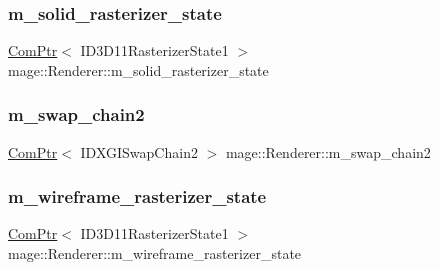 \subsubsection{\texorpdfstring{m\+\_\+solid\+\_\+rasterizer\+\_\+state}{m\_solid\_rasterizer\_state}}
{\footnotesize\ttfamily \hyperlink{namespacemage_ae74f374780900893caa5555d1031fd79}{Com\+Ptr}$<$ I\+D3\+D11\+Rasterizer\+State1 $>$ mage\+::\+Renderer\+::m\+\_\+solid\+\_\+rasterizer\+\_\+state\hspace{0.3cm}{\ttfamily [private]}}

\hypertarget{classmage_1_1_renderer_a96a55ac9d739141f6ea6692347134eec}{}\label{classmage_1_1_renderer_a96a55ac9d739141f6ea6692347134eec} 
\subsubsection{\texorpdfstring{m\+\_\+swap\+\_\+chain2}{m\_swap\_chain2}}
{\footnotesize\ttfamily \hyperlink{namespacemage_ae74f374780900893caa5555d1031fd79}{Com\+Ptr}$<$ I\+D\+X\+G\+I\+Swap\+Chain2 $>$ mage\+::\+Renderer\+::m\+\_\+swap\+\_\+chain2\hspace{0.3cm}{\ttfamily [private]}}

\hypertarget{classmage_1_1_renderer_a5049b7bdbf371963dd3e813323921760}{}\label{classmage_1_1_renderer_a5049b7bdbf371963dd3e813323921760} 
\subsubsection{\texorpdfstring{m\+\_\+wireframe\+\_\+rasterizer\+\_\+state}{m\_wireframe\_rasterizer\_state}}
{\footnotesize\ttfamily \hyperlink{namespacemage_ae74f374780900893caa5555d1031fd79}{Com\+Ptr}$<$ I\+D3\+D11\+Rasterizer\+State1 $>$ mage\+::\+Renderer\+::m\+\_\+wireframe\+\_\+rasterizer\+\_\+state\hspace{0.3cm}{\ttfamily [private]}}

